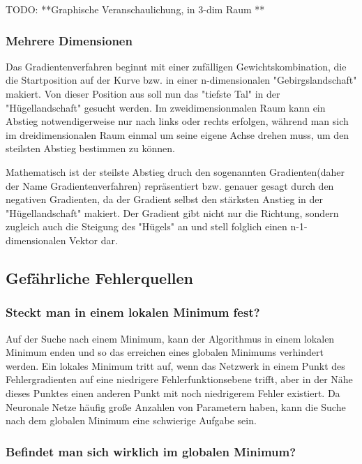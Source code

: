   TODO: **Graphische Veranschaulichung, in 3-dim Raum **
\subsubsection{Mehrere Dimensionen}\label{subsec:gradientenverfahren:mehrere_dimensionen}
  Das Gradientenverfahren beginnt mit einer zufälligen Gewichtskombination, die die Startposition auf der Kurve bzw. in einer n-dimensionalen "Gebirgslandschaft" makiert.
  Von dieser Position aus soll nun das "tiefste Tal" in der "Hügellandschaft" gesucht werden.
  Im zweidimensionmalen Raum kann ein Abstieg notwendigerweise nur nach links oder rechts erfolgen, während man sich im dreidimensionalen Raum einmal um seine eigene Achse drehen muss,
  um den steilsten Abstieg bestimmen zu können.

  Mathematisch ist der steilste Abstieg druch den sogenannten Gradienten(daher der Name Gradientenverfahren) repräsentiert bzw. genauer gesagt durch den negativen Gradienten, da der 
  Gradient selbst den stärksten Anstieg in der "Hügellandschaft" makiert. Der Gradient gibt nicht nur die Richtung, sondern zugleich auch die Steigung des "Hügels" an und stell folglich
  einen n-1-dimensionalen Vektor dar.\cite{GR10}


\subsection{Gefährliche Fehlerquellen}\label{subsec:gradientenverfahren:fehlerquellen}
\subsubsection{Steckt man in einem lokalen Minimum fest?}\label{subsec:gradientenverfahren:fehlerquellen_lokalen_minimum}
  Auf der Suche nach einem Minimum, kann der Algorithmus in einem lokalen Minimum enden und so das erreichen eines globalen Minimums verhindert werden.
  Ein lokales Minimum tritt auf, wenn das Netzwerk in einem Punkt des Fehlergradienten auf eine niedrigere Fehlerfunktionsebene trifft, aber in der Nähe dieses Punktes einen anderen Punkt mit noch niedrigerem Fehler existiert.
  Da Neuronale Netze häufig große Anzahlen von Parametern haben, kann die Suche nach dem globalen Minimum eine schwierige Aufgabe sein.\cite{HS97}

\subsubsection{Befindet man sich wirklich im globalen Minimum?}\label{subsec:gradientenverfahren:fehlerquellen_globalen_minimum}

